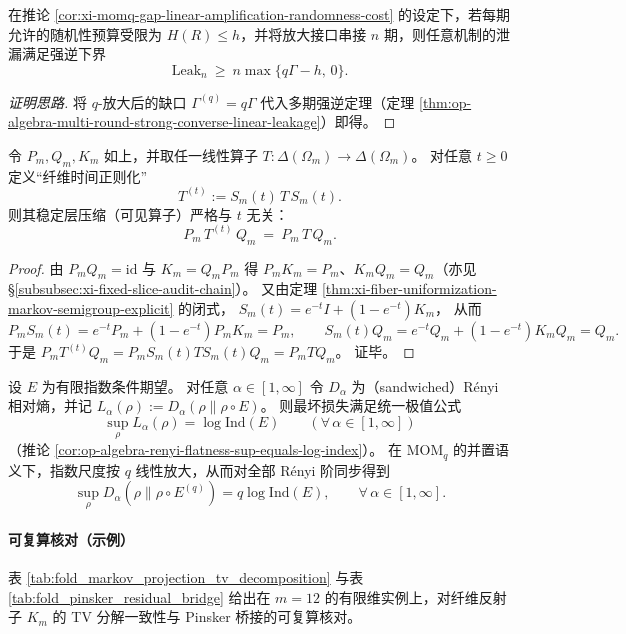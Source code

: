 \begin{corollary}\label{cor:xi-momq-strong-converse-bilinear-leakage}
在推论 \ref{cor:xi-momq-gap-linear-amplification-randomness-cost} 的设定下，若每期允许的随机性预算受限为 \(H(R)\le h\)，并将放大接口串接 \(n\) 期，则任意机制的泄漏满足强逆下界
\[
\boxed{\;
\mathrm{Leak}_n\ \ge\ n\max\{q\Gamma-h,\,0\}. \;}
\]
\end{corollary}
\begin{proof}[证明思路]
将 \(q\)-放大后的缺口 \(\Gamma^{(q)}=q\Gamma\) 代入多期强逆定理（定理 \ref{thm:op-algebra-multi-round-strong-converse-linear-leakage}）即得。
\end{proof}

\begin{proposition}\label{prop:xi-fiber-mixing-time-invisible-on-stable-compression}
令 \(P_m,Q_m,K_m\) 如上，并取任一线性算子 \(T:\Delta(\Omega_m)\to\Delta(\Omega_m)\)。
对任意 \(t\ge 0\) 定义“纤维时间正则化”
\[
T^{(t)}:=S_m(t)\,T\,S_m(t).
\]
则其稳定层压缩（可见算子）严格与 \(t\) 无关：
\[
\boxed{\;
P_m\,T^{(t)}\,Q_m\ =\ P_m\,T\,Q_m.\;}
\]
\end{proposition}
\begin{proof}
由 \(P_mQ_m=\mathrm{id}\) 与 \(K_m=Q_mP_m\) 得 \(P_mK_m=P_m\)、\(K_mQ_m=Q_m\)（亦见 \S\ref{subsubsec:xi-fixed-slice-audit-chain}）。
又由定理 \ref{thm:xi-fiber-uniformization-markov-semigroup-explicit} 的闭式，
\(
S_m(t)=e^{-t}I+(1-e^{-t})K_m
\)，
从而
\[
P_mS_m(t)=e^{-t}P_m+(1-e^{-t})P_mK_m=P_m,
\qquad
S_m(t)Q_m=e^{-t}Q_m+(1-e^{-t})K_mQ_m=Q_m.
\]
于是
\(
P_mT^{(t)}Q_m=P_mS_m(t)TS_m(t)Q_m=P_mTQ_m
\)。
证毕。
\end{proof}

\begin{corollary}\label{cor:xi-renyi-flatness-under-momq-amplification}
设 \(E\) 为有限指数条件期望。
对任意 \(\alpha\in[1,\infty]\) 令 \(D_\alpha\) 为（sandwiched）Rényi 相对熵，并记
\(
L_\alpha(\rho):=D_\alpha(\rho\|\rho\circ E)
\)。
则最坏损失满足统一极值公式
\[
\sup_{\rho}L_\alpha(\rho)=\log\mathrm{Ind}(E)
\qquad(\forall\,\alpha\in[1,\infty])
\]
（推论 \ref{cor:op-algebra-renyi-flatness-sup-equals-log-index}）。
在 \(\mathrm{MOM}_q\) 的并置语义下，指数尺度按 \(q\) 线性放大，从而对全部 Rényi 阶同步得到
\[
\boxed{\;
\sup_{\rho}D_\alpha(\rho\|\rho\circ E^{(q)})=q\log\mathrm{Ind}(E),
\qquad \forall\,\alpha\in[1,\infty].\;}
\]
\end{corollary}

\paragraph{可复算核对（示例）}
表 \ref{tab:fold_markov_projection_tv_decomposition} 与表 \ref{tab:fold_pinsker_residual_bridge} 给出在 \(m=12\) 的有限维实例上，对纤维反射子 \(K_m\) 的 TV 分解一致性与 Pinsker 桥接的可复算核对。


